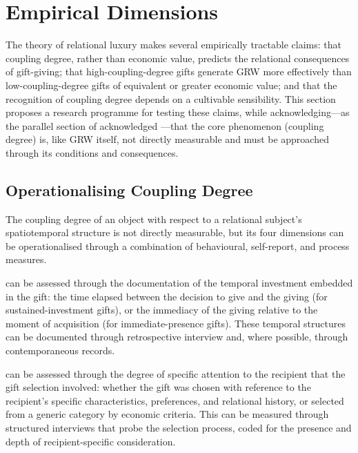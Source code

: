 \section{Empirical Dimensions}
\label{p16:sec:empirical}

\noindent
The theory of relational luxury makes several empirically tractable claims: that coupling degree, rather than economic value, predicts the relational consequences of gift-giving; that high-coupling-degree gifts generate GRW more effectively than low-coupling-degree gifts of equivalent or greater economic value; and that the recognition of coupling degree depends on a cultivable sensibility. This section proposes a research programme for testing these claims, while acknowledging---as the parallel section of  acknowledged \parencite{paperxv}---that the core phenomenon (coupling degree) is, like GRW itself, not directly measurable and must be approached through its conditions and consequences.

\subsection{Operationalising Coupling Degree}
\label{p16:subsec:operationalising}

\noindent
The coupling degree of an object with respect to a relational subject's spatiotemporal structure is not directly measurable, but its four dimensions can be operationalised through a combination of behavioural, self-report, and process measures.

 can be assessed through the documentation of the temporal investment embedded in the gift: the time elapsed between the decision to give and the giving (for sustained-investment gifts), or the immediacy of the giving relative to the moment of acquisition (for immediate-presence gifts). These temporal structures can be documented through retrospective interview and, where possible, through contemporaneous records.

 can be assessed through the degree of specific attention to the recipient that the gift selection involved: whether the gift was chosen with reference to the recipient's specific characteristics, preferences, and relational history, or selected from a generic category by economic criteria. This can be measured through structured interviews that probe the selection process, coded for the presence and depth of recipient-specific consideration.

